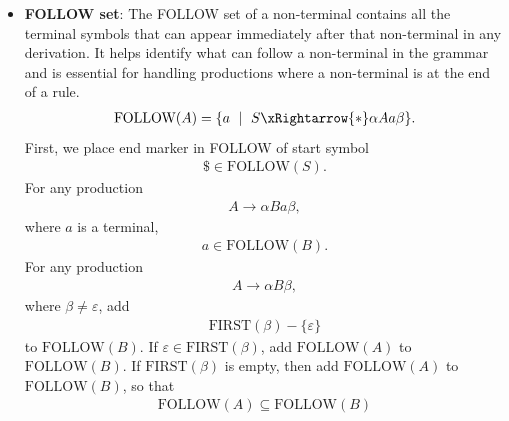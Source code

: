 \documentclass{report}
\begin{document}
\begin{itemize}
\begin{itemize}
                    compute $\text{FIRST}(\alpha)$ as follows,
                    \begin{enumerate}
                        \item Add FIRST($X_{1}$) - $\{\varepsilon\} $
                        \item If $\varepsilon \in \text{ FIRST}(X_{1})$, and $\text{FIRST}(X_{2}) - \{\epsilon\} $
                        \item Continue left to right
                        \item If all $X_{i}$ can derive $\varepsilon$, then include $\epsilon$ in $\text{FIRST}(\alpha) $
                    \end{enumerate}
                \item \textbf{FOLLOW set}: The FOLLOW set of a non-terminal contains all the terminal symbols that can appear immediately after that non-terminal in any derivation. It helps identify what can follow a non-terminal in the grammar and is essential for handling productions where a non-terminal is at the end of a rule.
                    \begin{align*}
                        \text{FOLLOW}(A) = \{a \ \mid \ S \xRightarrow{*} \alpha Aa \beta\}
                    .\end{align*}
                    First, we place end marker in FOLLOW of start symbol
                    \begin{align*}
                        \$ \in \text{FOLLOW}(S)
                    .\end{align*}
                    For any production 
                    \begin{align*}
                        A \to \alpha Ba \beta,
                    \end{align*}
                    where $a$ is a terminal, 
                    \begin{align*}
                        a \in \text{FOLLOW}(B)
                    .\end{align*}
                    For any production
                    \begin{align*}
                        A \to \alpha B \beta,
                    \end{align*}
                    where $\beta \ne \varepsilon$, add
                    \begin{align*}
                       \text{FIRST}(\beta) - \{\varepsilon\} 
                    \end{align*}
                    to $\text{FOLLOW}(B)$. If $\varepsilon \in \text{FIRST}(\beta)$, add $\text{FOLLOW}(A)$ to $\text{FOLLOW}(B)$. If $\text{FIRST}(\beta)$ is empty, then add $\text{FOLLOW}(A) $ to $\text{FOLLOW}(B)$, so that
                    \begin{align*}
                        \text{FOLLOW}(A) \subseteq \text{FOLLOW}(B)
                    \end{align*}
                


\end{itemize}
\end{itemize}
\end{document}
